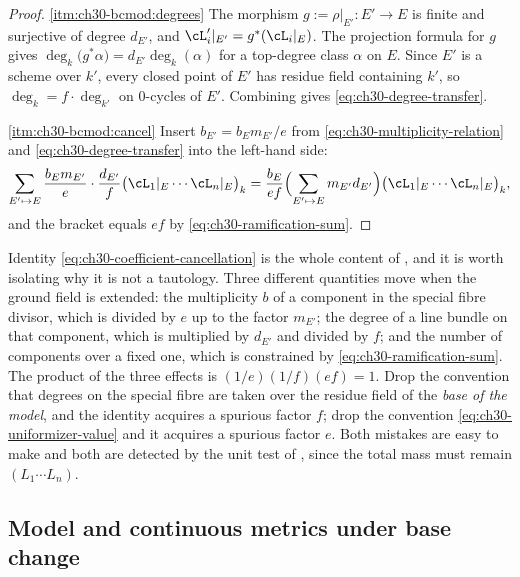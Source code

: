 \begin{proof}
\cref{itm:ch30-bcmod:degrees}  The morphism \(g:=\rho|_{E'}:E'\to E\) is
finite and surjective of degree \(d_{E'}\), and
\(\cL'_i|_{E'}=g^*(\cL_i|_E)\).  The projection formula for \(g\) gives
\(\deg_k\bigl(g^*\alpha\bigr)=d_{E'}\deg_k(\alpha)\) for a top-degree class
\(\alpha\) on \(E\).  Since \(E'\) is a scheme over \(k'\), every closed
point of \(E'\) has residue field containing \(k'\), so
\(\deg_k=f\cdot\deg_{k'}\) on \(0\)-cycles of \(E'\).  Combining gives
\eqref{eq:ch30-degree-transfer}.

\cref{itm:ch30-bcmod:cancel}  Insert
\(b_{E'}=b_Em_{E'}/e\) from \eqref{eq:ch30-multiplicity-relation} and
\eqref{eq:ch30-degree-transfer} into the left-hand side:
\[
 \sum_{E'\mapsto E}\frac{b_Em_{E'}}{e}\cdot\frac{d_{E'}}f
   \bigl(\cL_1|_E\cdots\cL_n|_E\bigr)_k
 =\frac{b_E}{ef}\Bigl(\sum_{E'\mapsto E}m_{E'}d_{E'}\Bigr)
   \bigl(\cL_1|_E\cdots\cL_n|_E\bigr)_k,
\]
and the bracket equals \(ef\) by \eqref{eq:ch30-ramification-sum}.
\end{proof}

\begin{remark}
\label{rem:ch30-cancellation}
Identity \eqref{eq:ch30-coefficient-cancellation} is the whole content of
, and it is worth isolating why it is not a
tautology.  Three different quantities move when the ground field is
extended: the multiplicity \(b\) of a component in the special fibre
divisor, which is divided by \(e\) up to the factor \(m_{E'}\); the degree
of a line bundle on that component, which is multiplied by \(d_{E'}\) and
divided by \(f\); and the number of components over a fixed one, which is
constrained by \eqref{eq:ch30-ramification-sum}.  The product of the three
effects is \((1/e)(1/f)(ef)=1\).  Drop the convention that degrees on the
special fibre are taken over the residue field of the \emph{base of the
model}, and the identity acquires a spurious factor \(f\); drop the
convention \eqref{eq:ch30-uniformizer-value} and it acquires a spurious
factor \(e\).  Both mistakes are easy to make and both are detected by the
unit test of , since the total mass must remain
\((L_1\cdots L_n)\).
\end{remark}

\subsection{Model and continuous metrics under base change}
\label{sec:ch30-bc-metrics}

